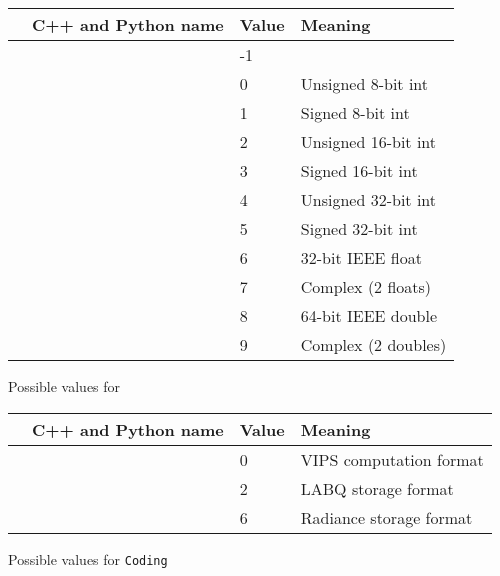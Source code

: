 \begin{tab2}
\begin{center}
\begin{tabular}{|l|l|l|l|}
\hline
\ct{BandFmt} 		    & C++ and Python name & Value & Meaning \\
\hline
\ct{IM\_BANDFMT\_NOTSET}    & \ct{FMTNOTSET}    & -1 & \\
\ct{IM\_BANDFMT\_UCHAR}     & \ct{FMTUCHAR}     & 0  & Unsigned 8-bit int \\
\ct{IM\_BANDFMT\_CHAR} 	    & \ct{FMTCHAR}      & 1  & Signed 8-bit int \\
\ct{IM\_BANDFMT\_USHORT}    & \ct{FMTUSHORT}    & 2  & Unsigned 16-bit int \\
\ct{IM\_BANDFMT\_SHORT}     & \ct{FMTSHORT}     & 3  & Signed 16-bit int \\
\ct{IM\_BANDFMT\_UINT} 	    & \ct{FMTUINT}      & 4  & Unsigned 32-bit int \\
\ct{IM\_BANDFMT\_INT} 	    & \ct{FMTINT}       & 5  & Signed 32-bit int \\
\ct{IM\_BANDFMT\_FLOAT}     & \ct{FMTFLOAT}     & 6  & 32-bit IEEE float \\
\ct{IM\_BANDFMT\_COMPLEX}   & \ct{FMTCOMPLEX}   & 7  & Complex (2 floats) \\
\ct{IM\_BANDFMT\_DOUBLE}    & \ct{FMTDOUBLE}    & 8  & 64-bit IEEE double \\
\ct{IM\_BANDFMT\_DPCOMPLEX} & \ct{FMTDPCOMPLEX} & 9  & Complex (2 doubles) \\
\hline
\end{tabular}
\end{center}
\caption{Possible values for \label{fg:bandfmt}}
\end{tab2}

\begin{tab2}
\begin{center}
\begin{tabular}{|l|l|l|l|}
\hline
\ct{Coding} & C++ and Python name & Value & Meaning \\
\hline
\ct{IM\_CODING\_NONE}  & \ct{NOCODING} & 0 & VIPS computation format \\
\ct{IM\_CODING\_LABQ}  & \ct{LABQ} & 2 & LABQ storage format \\
\ct{IM\_CODING\_RAD}  & \ct{RAD} & 6 & Radiance storage format \\
\hline
\end{tabular}
\end{center}
\caption{Possible values for \texttt{Coding}\label{fg:coding}}
\end{tab2}

